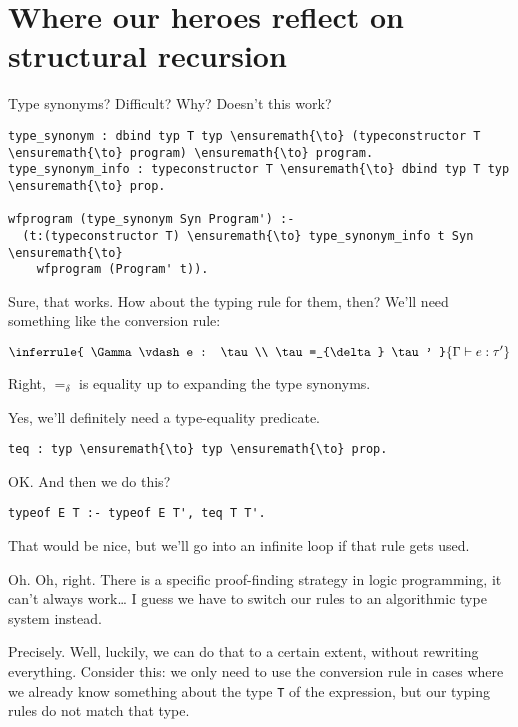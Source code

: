 \section{Where our heroes reflect on structural
recursion}\label{where-our-heroes-reflect-on-structural-recursion}

\heroSTUDENT{} Type synonyms? Difficult? Why? Doesn't this work?

\begin{verbatim}
type_synonym : dbind typ T typ \ensuremath{\to} (typeconstructor T \ensuremath{\to} program) \ensuremath{\to} program.
type_synonym_info : typeconstructor T \ensuremath{\to} dbind typ T typ \ensuremath{\to} prop.

wfprogram (type_synonym Syn Program') :-
  (t:(typeconstructor T) \ensuremath{\to} type_synonym_info t Syn \ensuremath{\to}
    wfprogram (Program' t)).
\end{verbatim}

\heroADVISOR{} Sure, that works. How about the typing rule for them, then?
We'll need something like the conversion rule:

\begin{displaymath}
\inferrule{
  \Gamma \vdash e : \tau \\ \tau =_{\delta} \tau'
}{
  \Gamma \vdash e : \tau'
}
\end{displaymath}

\heroSTUDENT{} Right, \(=_{\delta}\) is equality up to expanding the type
synonyms.

\heroADVISOR{} Yes, we'll definitely need a type-equality predicate.

\begin{verbatim}
teq : typ \ensuremath{\to} typ \ensuremath{\to} prop.
\end{verbatim}

\heroSTUDENT{} OK. And then we do this?

\begin{verbatim}
typeof E T :- typeof E T', teq T T'.
\end{verbatim}

\heroADVISOR{} That would be nice, but we'll go into an infinite loop if that
rule gets used.

\heroSTUDENT{} Oh. Oh, right. There is a specific proof-finding strategy in
logic programming, it can't always work\ldots{} I guess we have to
switch our rules to an algorithmic type system instead.

\heroADVISOR{} Precisely. Well, luckily, we can do that to a certain extent,
without rewriting everything. Consider this: we only need to use the
conversion rule in cases where we already know something about the type
\texttt{T} of the expression, but our typing rules do not match that
type.

